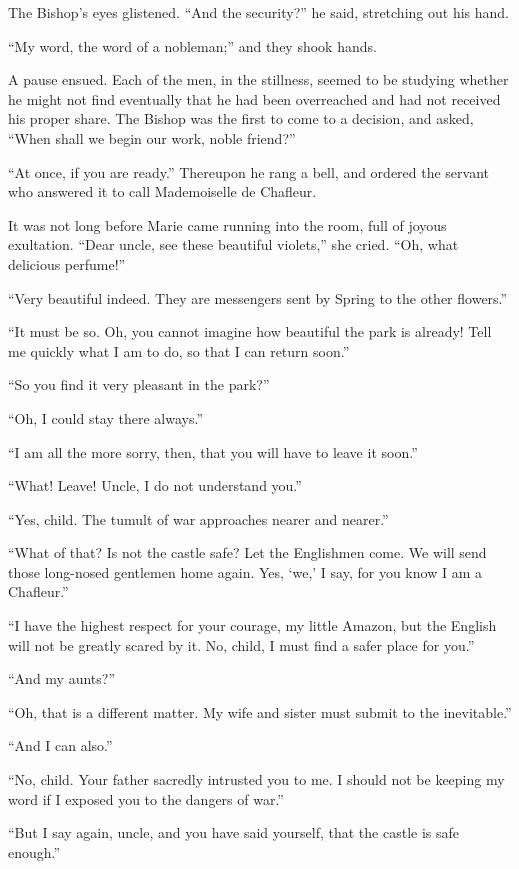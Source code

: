 The Bishop's eyes glistened. ``And the security?'' he said, stretching
out his hand.

``My word, the word of a nobleman;'' and they shook hands.

A pause ensued. Each of the men, in the stillness, seemed to be studying
whether he might not find eventually that he had been overreached and
had not received his proper share. The Bishop was the first to come to a
decision, and asked, ``When shall we begin our work, noble friend?''

``At once, if you are ready.'' Thereupon he rang a bell, and ordered the
servant who answered it to call Mademoiselle de Chafleur.

It was not long before Marie came running into the room, full of joyous
exultation. ``Dear uncle, see these beautiful violets,'' she cried.
``Oh, what delicious perfume!''

``Very beautiful indeed. They are messengers sent by Spring to the other
flowers.''

``It must be so. Oh, you cannot imagine how beautiful the park is
already! Tell me quickly what I am to do, so that I can return soon.''

``So you find it very pleasant in the park?''

``Oh, I could stay there always.''

``I am all the more sorry, then, that you will have to leave it soon.''

``What! Leave! Uncle, I do not understand you.''

``Yes, child. The tumult of war approaches nearer and nearer.''

``What of that? Is not the castle safe? Let the Englishmen come. We will
send those long-nosed gentlemen home again. Yes, `we,' I say, for you
know I am a Chafleur.''

``I have the highest respect for your courage, my little Amazon, but the
English will not be greatly scared by it. No, child, I must find a safer
place for you.''

``And my aunts?''

``Oh, that is a different matter. My wife and sister must submit to the
inevitable.''

``And I can also.''

``No, child. Your father sacredly intrusted you to me. I should not be
keeping my word if I exposed you to the dangers of war.''

``But I say again, uncle, and you have said yourself, that the castle is
safe enough.''

